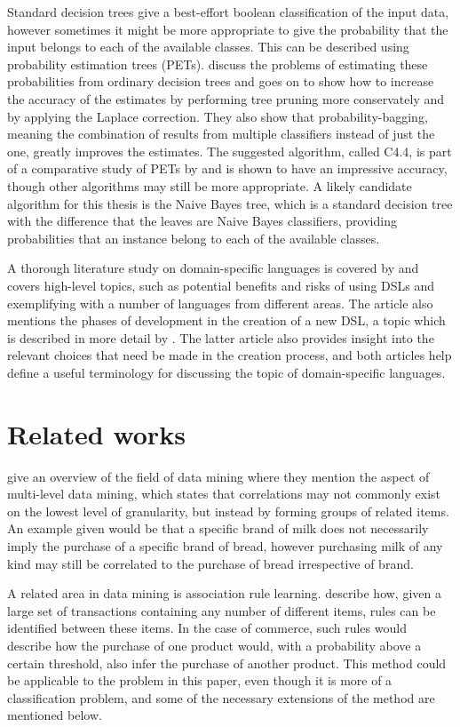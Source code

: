 \documentclass[a4paper]{article}
\begin{document}
Standard decision trees give a best-effort boolean classification of the input data, however sometimes it might be more
appropriate to give the probability that the input belongs to each of the available classes. This can be described using
probability estimation trees (PETs). \citet{Provost2003} discuss the problems of estimating these probabilities from ordinary
decision trees and goes on to show how to increase the accuracy of the estimates by performing tree pruning more conservately and
by applying the Laplace correction.  They also show that probability-bagging, meaning the combination of results from multiple
classifiers instead of just the one, greatly improves the estimates. The suggested algorithm, called C4.4, is part of a
comparative study of PETs by \citet{Chu2011} and is shown to have an impressive accuracy, though other algorithms may still be
more appropriate. A likely candidate algorithm for this thesis is the Naive Bayes tree, which is a standard decision tree with the
difference that the leaves are Naive Bayes classifiers, providing probabilities that an instance belong to each of the available
classes.

A thorough literature study on domain-specific languages is covered by \citet{Deursen2000} and covers high-level topics, such as
potential benefits and risks of using DSLs and exemplifying with a number of languages from different areas. The article also
mentions the phases of development in the creation of a new DSL, a topic which is described in more detail by \citet{Mernik2005}.
The latter article also provides insight into the relevant choices that need be made in the creation process, and both articles
help define a useful terminology for discussing the topic of domain-specific languages.

\section{Related works}
\citet{Chen1996} give an overview of the field of data mining where they mention the aspect of multi-level data mining, which
states that correlations may not commonly exist on the lowest level of granularity, but instead by forming groups of related
items. An example given would be that a specific brand of milk does not necessarily imply the purchase of a specific brand of
bread, however purchasing milk of any kind may still be correlated to the purchase of bread irrespective of brand.

A related area in data mining is association rule learning. \citet{Agrawal1993} describe how, given a large set of
transactions containing any number of different items, rules can be identified between these items. In the case of commerce,
such rules would describe how the purchase of one product would, with a probability above a certain threshold, also infer
the purchase of another product. This method could be applicable to the problem in this paper, even though it is more of a
classification problem, and some of the necessary extensions of the method are mentioned below.
\end{document}
